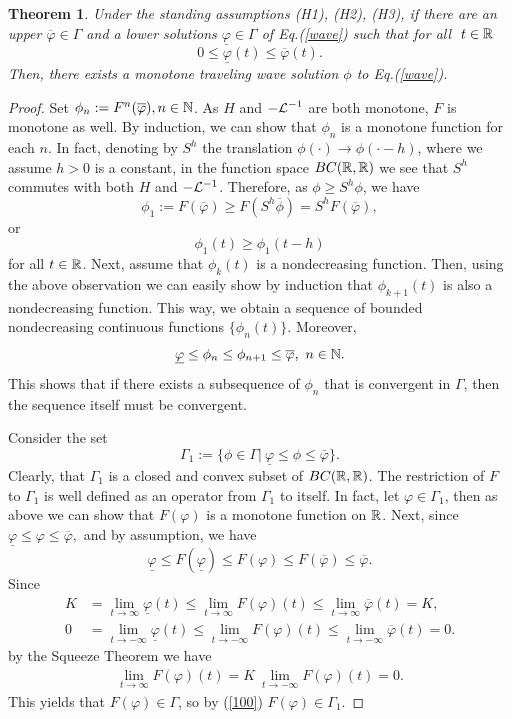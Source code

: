 \documentclass[12pt,letterpaper]{amsart}
\newtheorem{theorem}{Theorem}[section]
\theoremstyle{definition}
\theoremstyle{remark}
\numberwithin{equation}{section}
\begin{document}
\begin{theorem}\label{the main}
Under the standing assumptions (H1), (H2), (H3), if there are an upper $\overline{\varphi} \in \Gamma$ and a lower solutions $\underline{\varphi}\in \Gamma $ of Eq.(\ref{wave}) such that for all $ \ t\in \R $
$$
0\le  \underline{\varphi}(t)\le \overline{\varphi}(t) .
$$
Then, there exists a monotone traveling wave solution $\phi$ to Eq.(\ref{wave}).
\end{theorem}
\begin{proof}
Set $\phi_n:=F^n(\overline{\varphi}), n\in\N$. As $H$ and ${-\cal L}^{-1}$ are both monotone, $F$ is monotone as well. By induction, we can show that $\phi_n$ is a monotone function for each $n$. In fact, denoting by $S^h$ the translation $\phi(\cdot ) \to \phi(\cdot -h)$, where we assume $h >0$ is a constant, in the function space $BC(\R,\R)$ we see that $S^h$ commutes with both $H$ and $-{\cal L}^{-1}$. Therefore, as $\phi \ge S^h\phi$, we have
$$
\phi_1 := F(\overline{\varphi} ) \ge F(S^h\overline{\phi})=S^h F(\overline{\varphi }),
$$
or
$$
\phi_1(t) \ge \phi_1 (t-h)
$$
for all $t\in \R$. Next, assume that $\phi_k(t)$ is a nondecreasing function. Then, using the above observation we can easily show by induction that $\phi_{k+1}(t)$ is also a nondecreasing function. This way, we obtain a sequence of bounded nondecreasing continuous functions $\{\phi_n(t)\}$. Moreover, 
$$
\underline{\varphi} \le \phi_n   \le \phi_{n+1}\le \overline{\varphi} , \ n\in \N .
$$
This shows that if there exists a subsequence of $\phi_n$ that is convergent in $\Gamma$, then the sequence itself must be convergent. 

\medskip
Consider the set 
$$
\Gamma_1:= \{ \phi\in \Gamma | \ \underline{\varphi} \le \phi \le \overline{\varphi}  \} .
$$
Clearly, that $\Gamma_1$ is a closed and convex subset of $BC(\R,\R)$. The restriction of $F$ to $\Gamma_1$ is well defined as an operator from $\Gamma_1$ to itself. In fact, let $\varphi \in \Gamma_1$, then as above we can show that $F(\varphi)$ is a monotone function on $\R$. Next, since
$
\underline{\varphi} \le \varphi \le \overline{\varphi},
$
and by assumption, we have
\begin{equation}\label{100}
\underline{\varphi} \le F(\underline{\varphi})  \le F(\varphi) \le F(\overline{\varphi}) \le \overline{\varphi}.
\end{equation}
Since
\begin{align*}
K & =\lim_{t\to\infty} \underline{\varphi}(t) \le  \lim_{t\to\infty}  F(\varphi) (t)\le \lim_{t\to\infty}  \overline{\varphi}(t) =K,\\
0 & =\lim_{t\to-\infty} \underline{\varphi} (t)\le  \lim_{t\to-\infty}  F(\varphi) (t)\le \lim_{t\to- \infty}  \overline{\varphi}(t) =0.
\end{align*}
by the Squeeze Theorem we  have 
\begin{align}
  \lim_{t\to\infty}  F(\varphi)(t)=K \
  \lim_{t\to-\infty}  F(\varphi) (t) =0.
\end{align}
This yields that
$ F(\varphi)  \in \Gamma$, so by (\ref{100}) $ F(\varphi)  \in \Gamma_1$.


\end{proof}
\end{document}
